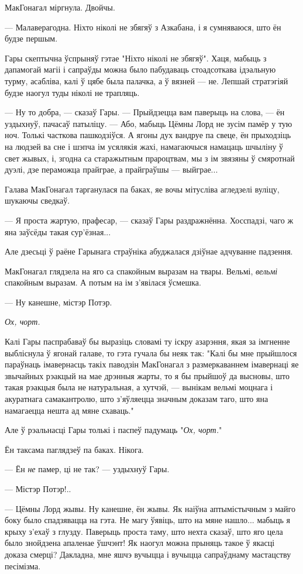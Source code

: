 МакГонагал міргнула. Двойчы. 

--- Малаверагодна. Ніхто ніколі не збягяў з Азкабана, і я сумняваюся, што ён 
будзе першым.

Гары скептычна ўспрыняў гэтае "Ніхто ніколі не збягяў". Хаця, мабыць з дапамогай
магіі і сапраўды можна было пабудаваць стоадсоткава ідэальную турму, асабліва, калі
ў цябе была палачка, а ў вязней --- не. Лепшай стратэгіяй будзе наогул туды 
ніколі не трапляць.

--- Ну то добра, --- сказаў Гары. --- Прыйдзецца вам паверыць на слова, ---
ён уздыхнуў, пачасаў патыліцу. --- Або, мабыць Цёмны Лорд не зусім памёр у 
тую ноч. Толькі часткова пашкодзіўся. А ягоны дух вандруе па свеце, ён 
прыходзіць на людзей ва сне і шэпча ім усялякія жахі, намагаючыся намацаць 
шчыліну ў свет жывых, і, згодна са старажытным прароцтвам, мы з ім звязяны
ў смяротнай дуэлі, дзе пераможца прайграе, а прайграўшы --- выйграе...

Галава МакГонагал тарганулася па баках, яе вочы мітусліва агледзелі вуліцу,
шукаючы сведкаў.

--- Я проста жартую, прафесар, --- сказаў Гары раздражнённа. Хосспадзі, чаго ж
яна заўсёды такая сур'ёзная...

Але дзесьці ў раёне Гарынага страўніка абуджалася дзіўнае адчуванне падзення.

МакГонагал глядзела на яго са спакойным выразам на твары. Вельмі, 
\emph{вельмі} спакойным выразам. А потым на ім з'явілася ўсмешка.

--- Ну канешне, містэр Потэр.

\emph{Ох, чорт.}

Калі Гары паспрабаваў бы выразіць словамі ту іскру азарэння, якая за імгненне
выбліснула ў ягонай галаве, то гэта гучала бы неяк так: "Калі бы мне прыйшлося
параўнаць імавернасць такіх паводзін МакГонагал з размеркаваннем 
імавернаці яе звычайных рэакцый на мае дрэнныя жарты, то я бы прыйшоў да высновы,
што такая рэакцыя была не натуральная, а хутчэй, --- вынікам вельмі моцнага і
акуратнага самакантролю, што з'яўляецца значным доказам таго, што яна 
намагаецца нешта ад мяне схаваць."

Але ў рэальнасці Гары толькі і паспеў падумаць "\emph{Ох, чорт.}"

Ён таксама паглядзеў па баках. Нікога.

--- Ён \emph{не} памер, ці не так? --- уздыхнуў Гары.

--- Містэр Потэр!..

--- Цёмны Лорд жывы. Ну канешне, ён жывы. Як наіўна аптымістычным з майго боку было спадзявацца
на гэта. Не магу ўявіць, што на мяне нашло... мабыць я крыху з'ехаў з глузду.
Паверыць проста таму, што нехта сказаў, што яго цела было знойдзена апаленае 
ўшчэнт! Як наогул можна прыняць такое ў якасці доказа смерці? Дакладна, мне 
яшчэ вучыцца і вучыцца сапраўднаму мастацству песімізма.

